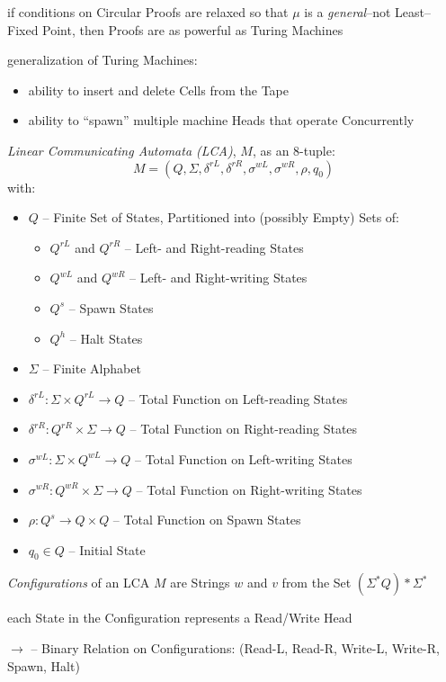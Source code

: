 if conditions on Circular Proofs are relaxed so that $\mu$ is a
\emph{general}--not Least--Fixed Point, then Proofs are as powerful as
Turing Machines

generalization of Turing Machines:
\begin{itemize}
  \item ability to insert and delete Cells from the Tape
  \item ability to ``spawn'' multiple machine Heads that operate
    Concurrently
\end{itemize}

\emph{Linear Communicating Automata (LCA)}, $M$, as an $8$-tuple:
\[
  M = (Q,\Sigma,\delta^{rL},\delta^{rR},\sigma^{wL},\sigma^{wR},\rho,q_0)
\]
with:
\begin{itemize}
  \item $Q$ -- Finite Set of States, Partitioned into (possibly
    Empty) Sets of:
    \begin{itemize}
      \item $Q^{rL}$ and $Q^{rR}$ -- Left- and Right-reading States
      \item $Q^{wL}$ and $Q^{wR}$ -- Left- and Right-writing States
      \item $Q^s$ -- Spawn States
      \item $Q^h$ -- Halt States
    \end{itemize}
  \item $\Sigma$ -- Finite Alphabet
  \item $\delta^{rL} : \Sigma \times Q^{rL} \rightarrow Q$ -- Total
    Function on Left-reading States
  \item $\delta^{rR} : Q^{rR} \times \Sigma \rightarrow Q$ -- Total
    Function on Right-reading States
  \item $\sigma^{wL} : \Sigma \times Q^{wL} \rightarrow Q$ -- Total
    Function on Left-writing States
  \item $\sigma^{wR} : Q^{wR} \times \Sigma \rightarrow Q$ -- Total
    Function on Right-writing States
  \item $\rho : Q^s \rightarrow Q \times Q$ -- Total Function on Spawn
    States
  \item $q_0 \in Q$ -- Initial State
\end{itemize}

\emph{Configurations} of an LCA $M$ are Strings $w$ and $v$ from the Set
$(\Sigma^*Q)*\Sigma^*$

each State in the Configuration represents a Read/Write Head

$\longrightarrow$ -- Binary Relation on Configurations:
(Read-L, Read-R, Write-L, Write-R, Spawn, Halt) %

